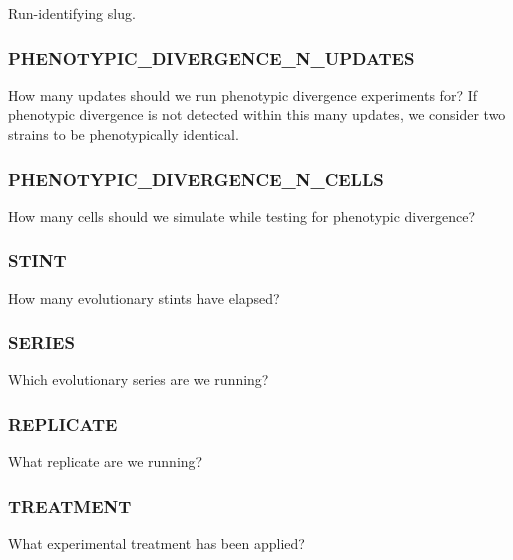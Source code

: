 
Run-identifying slug.

\subsubsection{PHENOTYPIC\_DIVERGENCE\_N\_UPDATES}


How many updates should we run phenotypic divergence experiments for?
If phenotypic divergence is not detected within this many updates, we consider two strains to be phenotypically identical.

\subsubsection{PHENOTYPIC\_DIVERGENCE\_N\_CELLS}


How many cells should we simulate while testing for phenotypic divergence?

\subsubsection{STINT}


How many evolutionary stints have elapsed?

\subsubsection{SERIES}


Which evolutionary series are we running?

\subsubsection{REPLICATE}


What replicate are we running?

\subsubsection{TREATMENT}


What experimental treatment has been applied?

